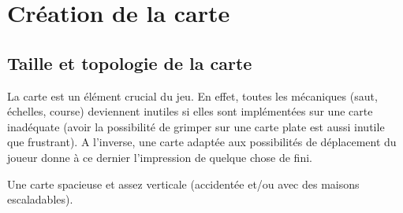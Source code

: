 \documentclass[../doc.tex]{subfiles}
\begin{document}
    \section{Création de la carte}

    \subsection{Taille et topologie de la carte}
    
    La carte est un élément crucial du jeu. En effet, toutes les mécaniques (saut, échelles, course)
    deviennent inutiles si elles sont implémentées sur une carte inadéquate (avoir la possibilité de grimper 
    sur une carte plate est aussi inutile que frustrant).
    A l'inverse, une carte adaptée aux possibilités de déplacement du joueur donne à ce dernier
    l'impression de quelque chose de fini.

    Une carte spacieuse et assez verticale (accidentée et/ou avec des maisons escaladables).
\end{document}
